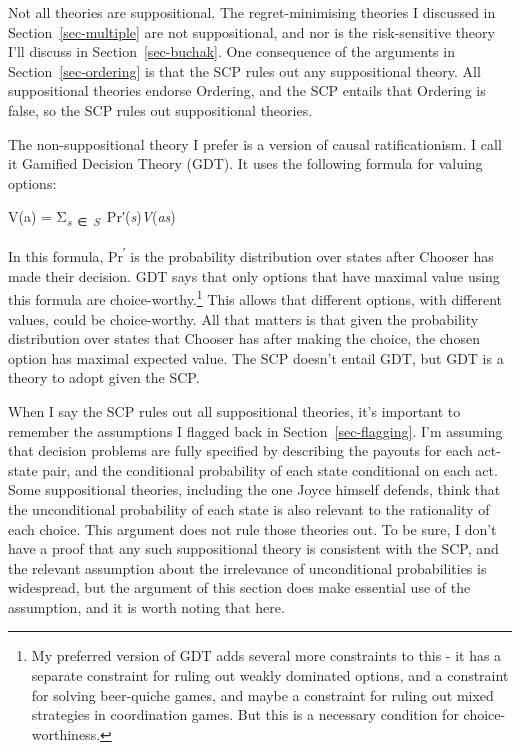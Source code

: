 \documentclass[
  10pt,
  letterpaper,
  DIV=11,
  numbers=noendperiod,
  twoside]{scrartcl}
\providecommand{\tightlist}{%
  \setlength{\itemsep}{0pt}\setlength{\parskip}{0pt}}\usepackage{longtable,booktabs,array}
\begin{document}
Not all theories are suppositional. The regret-minimising theories I
discussed in Section~\ref{sec-multiple} are not suppositional, and nor
is the risk-sensitive theory I'll discuss in Section~\ref{sec-buchak}.
One consequence of the arguments in Section~\ref{sec-ordering} is that
the SCP rules out any suppositional theory. All suppositional theories
endorse Ordering, and the SCP entails that Ordering is false, so the SCP
rules out suppositional theories.

The non-suppositional theory I prefer is a version of causal
ratificationism. I call it Gamified Decision Theory (GDT). It uses the
following formula for valuing options:

\begin{description}
\tightlist
\item[GDT]
V(a) =
Σ\textsubscript{\emph{s}~∈~\emph{S}}~Pr′(\emph{s})\emph{V}(\emph{as})
\end{description}

In this formula, Pr\textsuperscript{′} is the probability distribution
over states after Chooser has made their decision. GDT says that only
options that have maximal value using this formula are
choice-worthy.\footnote{My preferred version of GDT adds several more
  constraints to this - it has a separate constraint for ruling out
  weakly dominated options, and a constraint for solving beer-quiche
  games, and maybe a constraint for ruling out mixed strategies in
  coordination games. But this is a necessary condition for
  choice-worthiness.} This allows that different options, with different
values, could be choice-worthy. All that matters is that given the
probability distribution over states that Chooser has after making the
choice, the chosen option has maximal expected value. The SCP doesn't
entail GDT, but GDT is a theory to adopt given the SCP.

When I say the SCP rules out all suppositional theories, it's important
to remember the assumptions I flagged back in
Section~\ref{sec-flagging}. I'm assuming that decision problems are
fully specified by describing the payouts for each act-state pair, and
the conditional probability of each state conditional on each act. Some
suppositional theories, including the one Joyce himself defends, think
that the unconditional probability of each state is also relevant to the
rationality of each choice. This argument does not rule those theories
out. To be sure, I don't have a proof that any such suppositional theory
is consistent with the SCP, and the relevant assumption about the
irrelevance of unconditional probabilities is widespread, but the
argument of this section does make essential use of the assumption, and
it is worth noting that here.
\end{document}
